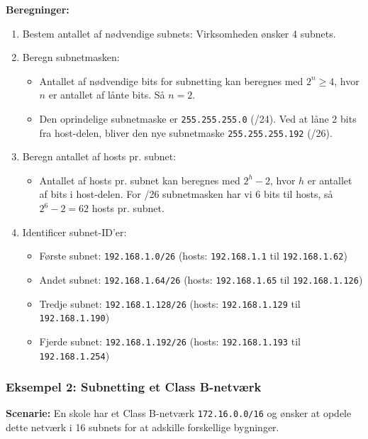 \textbf{Beregninger:}
\begin{enumerate}
	\item Bestem antallet af nødvendige subnets: Virksomheden ønsker 4 subnets.
	\item Beregn subnetmasken:
	\begin{itemize}
		\item Antallet af nødvendige bits for subnetting kan beregnes med \(2^n \geq 4\), hvor \(n\) er antallet af lånte bits. Så \(n = 2\).
		\item Den oprindelige subnetmaske er \texttt{255.255.255.0} (/24). Ved at låne 2 bits fra host-delen, bliver den nye subnetmaske \texttt{255.255.255.192} (/26).
	\end{itemize}
	\item Beregn antallet af hosts pr. subnet:
	\begin{itemize}
		\item Antallet af hosts pr. subnet kan beregnes med \(2^h - 2\), hvor \(h\) er antallet af bits i host-delen. For /26 subnetmasken har vi 6 bits til hosts, så \(2^6 - 2 = 62\) hosts pr. subnet.
	\end{itemize}
	\item Identificer subnet-ID'er:
	\begin{itemize}
		\item Første subnet: \texttt{192.168.1.0/26} (hosts: \texttt{192.168.1.1} til \texttt{192.168.1.62})
		\item Andet subnet: \texttt{192.168.1.64/26} (hosts: \texttt{192.168.1.65} til \texttt{192.168.1.126})
		\item Tredje subnet: \texttt{192.168.1.128/26} (hosts: \texttt{192.168.1.129} til \texttt{192.168.1.190})
		\item Fjerde subnet: \texttt{192.168.1.192/26} (hosts: \texttt{192.168.1.193} til \texttt{192.168.1.254})
	\end{itemize}
\end{enumerate}

\subsubsection{Eksempel 2: Subnetting et Class B-netværk}
\textbf{Scenarie:} En skole har et Class B-netværk \texttt{172.16.0.0/16} og ønsker at opdele dette netværk i 16 subnets for at adskille forskellige bygninger.

